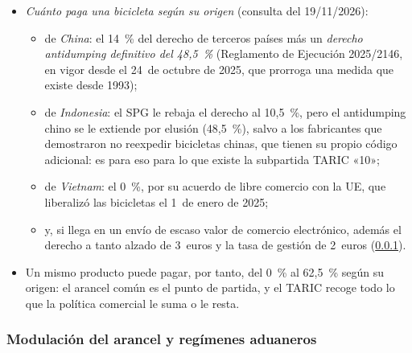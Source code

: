 \documentclass[11pt]{article}
\begin{document}
\begin{itemize}
\item \emph{Cuánto paga una bicicleta según su origen} (consulta del 19/11/2026)\nocite{CE2026TARICBicicletas}:
  \begin{itemize}
  \item de \emph{China}: el 14~\% del derecho de terceros países más un \emph{derecho antidumping definitivo del 48,5~\%} (Reglamento de Ejecución 2025/2146, en vigor desde el 24~de octubre de 2025, que prorroga una medida que existe desde 1993)\nocite{CE2026TARICBicicletas};
  \item de \emph{Indonesia}: el SPG le rebaja el derecho al 10,5~\%, pero el antidumping chino se le extiende por elusión (48,5~\%), salvo a los fabricantes que demostraron no reexpedir bicicletas chinas, que tienen su propio código adicional: es para eso para lo que existe la subpartida TARIC «10»;
  \item de \emph{Vietnam}: el 0~\%, por su acuerdo de libre comercio con la UE, que liberalizó las bicicletas el 1~de enero de 2025\nocite{CE2026TARICBicicletas};
  \item y, si llega en un envío de escaso valor de comercio electrónico, además el derecho a tanto alzado de 3~euros y la tasa de gestión de 2~euros (\ref{sec:modulacion}).
  \end{itemize}
\item Un mismo producto puede pagar, por tanto, del 0~\% al 62,5~\% según su origen: el arancel común es el punto de partida, y el TARIC recoge todo lo que la política comercial le suma o le resta.
\end{itemize}

\subsubsection{Modulación del arancel y regímenes aduaneros}\label{sec:modulacion}
\end{document}
